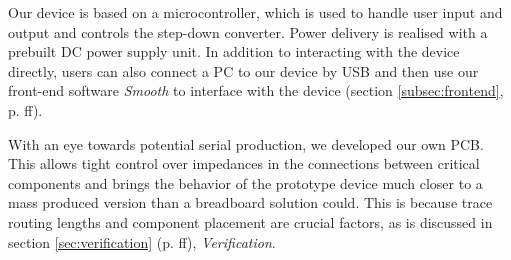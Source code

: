 Our device is based  on a microcontroller, which is used  to handle user input
and output and  controls the step-down converter.  Power  delivery is realised
with a  prebuilt DC  power supply  unit. In addition  to interacting  with the
device directly, users can also connect a PC to our device by USB and then use
our front-end  software \emph{Smooth}  to interface  with the  device (section
\ref{subsec:frontend}, p. \pageref{subsec:frontend}ff).

With an eye towards  potential serial production, we developed our own PCB. This
allows  tight  control  over impedances  in  the  connections  between  critical
components and brings the behavior of the prototype device much closer to a mass
produced version than a breadboard solution could. This is because trace routing
lengths and component placement are  crucial factors, as is discussed in section
\ref{sec:verification}  (p.  \pageref{sec:verification}ff), \emph{Verification}.
